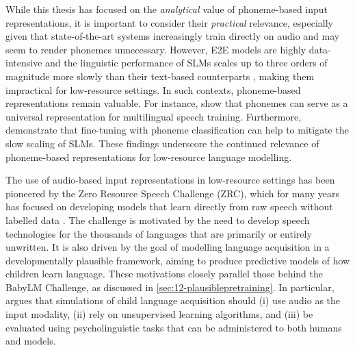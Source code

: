 While this thesis has focused on the \emph{analytical} value of phoneme-based input representations, it is important to consider their \emph{practical} relevance, especially given that state-of-the-art systems increasingly train directly on audio and may seem to render phonemes unnecessary. However, E2E models are highly data-intensive \citep{li2022recent} and the linguistic performance of SLMs scales up to three orders of magnitude more slowly than their text-based counterparts \citep{cuervo2024scaling}, making them impractical for low-resource settings. In such contexts, phoneme-based representations remain valuable. For instance, \citet{feng-2023-language-universal-phonetic} show that phonemes can serve as a universal representation for multilingual speech training. Furthermore, \citet{poli2024improving} demonstrate that fine-tuning with phoneme classification can help to mitigate the slow scaling of SLMs. These findings underscore the continued relevance of phoneme-based representations for low-resource language modelling.



The use of audio-based input representations in low-resource settings has been pioneered by the Zero Resource Speech Challenge (ZRC), which for many years has focused on developing models that learn directly from raw speech without labelled data \citep[see][for an overview]{dunbar2022self}. The challenge is motivated by the need to develop speech technologies for the thousands of languages that are primarily or entirely unwritten. It is also driven by the goal of modelling language acquisition in a developmentally plausible framework, aiming to produce predictive models of how children learn language. These motivations closely parallel those behind the BabyLM Challenge, as discussed in \cref{sec:12-plausiblepretraining}. In particular, \citet{dupoux-2018-cognitive} argues that simulations of child language acquisition should (i) use audio as the input modality, (ii) rely on unsupervised learning algorithms, and (iii) be evaluated using psycholinguistic tasks that can be administered to both humans and models.

